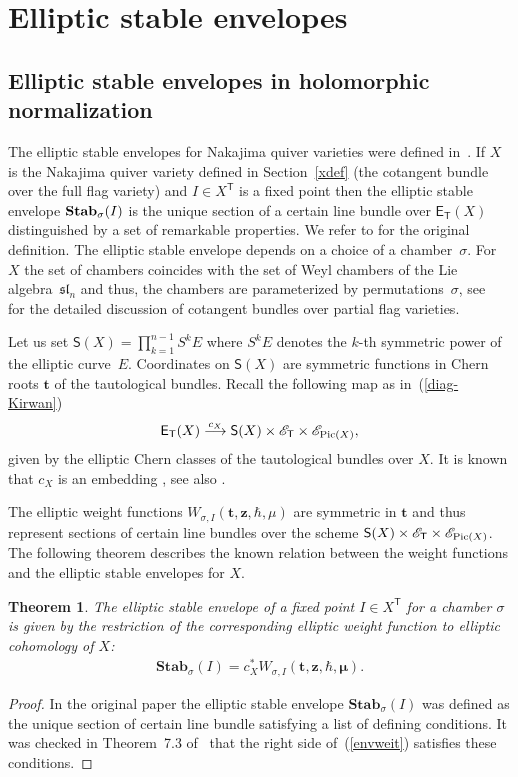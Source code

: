 \documentclass[pdftex]{sigma}
\newcommand{\bT}{\mathsf{T}}
\newcommand{\cE}{\mathscr{E}}
\def\ttt{{\boldsymbol t}}
\def\zz{{\boldsymbol z}}
\def\mub{{\boldsymbol\mu}}
\numberwithin{equation}{section}
\newtheorem{Theorem}{Theorem}[section]
\begin{document}
\section{Elliptic stable envelopes \label{envelsection}}
\subsection{Elliptic stable envelopes in holomorphic normalization}
The elliptic stable envelopes for Nakajima quiver varieties were defined in~\cite{AOelliptic}. If $X$ is the Nakajima quiver variety defined in Section~\ref{xdef} (the cotangent bundle over the full flag variety) and $I\in X^{\bT}$ is a fixed point then the elliptic stable envelope ${\bf Stab}_{\sigma}(I)$ is the unique section of a certain line bundle over $\textsf{E}_{\bT}(X)$ distinguished by a set of remarkable properties. We refer to \cite[Section~3]{AOelliptic} for the original definition. The elliptic stable envelope depends on a choice of a chamber~$\sigma$. For~$X$ the set of chambers coincides with the set of Weyl chambers of the Lie algebra~$\mathfrak{sl}_{n}$ and thus, the chambers are parameterized by permutations~$\sigma$, see~\cite{Rim} for the detailed discussion of cotangent bundles over partial flag varieties.

Let us set $\mathsf{S}(X)=\prod\limits_{k=1}^{n-1} S^k E$ where $S^k E$ denotes the $k$-th symmetric power of the elliptic curve~$E$. Coordinates on $\mathsf{S}(X)$ are symmetric functions in Chern roots $\ttt$ of the tautological bundles. Recall the following map as in~(\ref{diag-Kirwan})
\begin{gather*}
\textsf{E}_{\bT}(X) \stackrel{c_{X}}{\longrightarrow} \mathsf{S}(X)\times \cE_{\bT} \times \cE_{{\rm Pic}(X)},
\end{gather*}
given by the elliptic Chern classes of the tautological bundles over $X$. It is known that $c_{X}$ is an embedding \cite{McGN}, see also \cite[Section~2.4]{AOelliptic}.

The elliptic weight functions $W_{\sigma, I}(\ttt,\zz,\hbar,\mu)$ are symmetric in $\ttt$ and thus represent sections of certain line bundles over the scheme $\mathsf{S}(X)\times \cE_{\bT} \times \cE_{{\rm Pic}(X)}$. The following theorem describes the known relation between the weight functions and the elliptic stable envelopes for $X$.
\begin{Theorem}The elliptic stable envelope of a fixed point $I\in X^{\bT}$ for a chamber $\sigma$ is given by the restriction of the corresponding elliptic weight function to elliptic cohomology of $X$:
\begin{gather} \label{envweit}
\textbf{Stab}_{\sigma}(I)=c_{X}^{*}W_{\sigma, I}(\ttt,\zz,\hbar,\mub).
\end{gather}
\end{Theorem}
\begin{proof}In the original paper \cite{AOelliptic} the elliptic stable envelope $\textbf{Stab}_{\sigma}(I)$ was defined as the unique section of certain line bundle satisfying a list of defining conditions. It was checked in Theorem~7.3 of~\cite{RTV} that the right side of~(\ref{envweit}) satisfies these conditions.
\end{proof}
\end{document}
